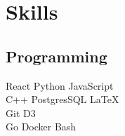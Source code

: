 \documentclass[letterpaper]{deedy-resume} %
\begin{document}
\begin{minipage}[t]{0.33\textwidth}





\section{Skills}

\subsection{Programming}

\textbullet{} React \textbullet{} Python \textbullet{} JavaScript \\
\textbullet{} C++ \textbullet{} PostgresSQL \textbullet{} \LaTeX\ \\
\textbullet{} Git \textbullet{} D3 \\
\textbullet{} Go  \textbullet{} Docker \textbullet{} Bash


\end{minipage}
\end{document}

